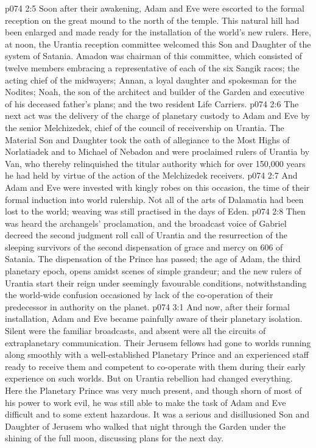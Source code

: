 \vs p074 2:5 \pc Soon after their awakening, Adam and Eve were escorted to the formal reception on the great mound to the north of the temple. This natural hill had been enlarged and made ready for the installation of the world’s new rulers. Here, at noon, the Urantia reception committee welcomed this Son and Daughter of the system of Satania. Amadon was chairman of this committee, which consisted of twelve members embracing a representative of each of the six Sangik races; the acting chief of the midwayers; Annan, a loyal daughter and spokesman for the Nodites; Noah, the son of the architect and builder of the Garden and executive of his deceased father’s plans; and the two resident Life Carriers.
\vs p074 2:6 The next act was the delivery of the charge of planetary custody to Adam and Eve by the senior Melchizedek, chief of the council of receivership on Urantia. The Material Son and Daughter took the oath of allegiance to the Most Highs of Norlatiadek and to Michael of Nebadon and were proclaimed rulers of Urantia by Van, who thereby relinquished the titular authority which for over 150,000 years he had held by virtue of the action of the Melchizedek receivers.
\vs p074 2:7 And Adam and Eve were invested with kingly robes on this occasion, the time of their formal induction into world rulership. Not all of the arts of Dalamatia had been lost to the world; weaving was still practised in the days of Eden.
\vs p074 2:8 Then was heard the archangels’ proclamation, and the broadcast voice of Gabriel decreed the second judgment roll call of Urantia and the resurrection of the sleeping survivors of the second dispensation of grace and mercy on 606 of Satania. The dispensation of the Prince has passed; the age of Adam, the third planetary epoch, opens amidst scenes of simple grandeur; and the new rulers of Urantia start their reign under seemingly favourable conditions, notwithstanding the world\hyp{}wide confusion occasioned by lack of the co\hyp{}operation of their predecessor in authority on the planet.
\vs p074 3:1 And now, after their formal installation, Adam and Eve became painfully aware of their planetary isolation. Silent were the familiar broadcasts, and absent were all the circuits of extraplanetary communication. Their Jerusem fellows had gone to worlds running along smoothly with a well\hyp{}established Planetary Prince and an experienced staff ready to receive them and competent to co\hyp{}operate with them during their early experience on such worlds. But on Urantia rebellion had changed everything. Here the Planetary Prince was very much present, and though shorn of most of his power to work evil, he was still able to make the task of Adam and Eve difficult and to some extent hazardous. It was a serious and disillusioned Son and Daughter of Jerusem who walked that night through the Garden under the shining of the full moon, discussing plans for the next day.

